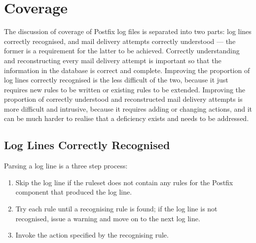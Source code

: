 

\FloatBarrier{}

\section{Coverage}

\label{parsing coverage}

The discussion of \parsernames{} coverage of Postfix log files is separated
into two parts: log lines correctly recognised, and mail delivery attempts
correctly understood --- the former is a requirement for the latter to be
achieved.  Correctly understanding and reconstructing every mail delivery
attempt is important so that the information in the database is correct and
complete.  Improving the proportion of log lines correctly recognised is
the less difficult of the two, because it just requires new rules to be
written or existing rules to be extended.  Improving the proportion of
correctly understood and reconstructed mail delivery attempts is more
difficult and intrusive, because it requires adding or changing actions,
and it can be much harder to realise that a deficiency exists and needs to
be addressed.

\subsection{Log Lines Correctly Recognised}

\label{log-lines-covered}

Parsing a log line is a three step process:

\begin{enumerate}

    \squeezeitems{}

    \item Skip the log line if the ruleset does not contain any rules for
        the Postfix component that produced the log line.

    \item Try each rule until a recognising rule is found; if the log line
        is not recognised, issue a warning and move on to the next log
        line.

    \item Invoke the action specified by the recognising rule.

\end{enumerate}

